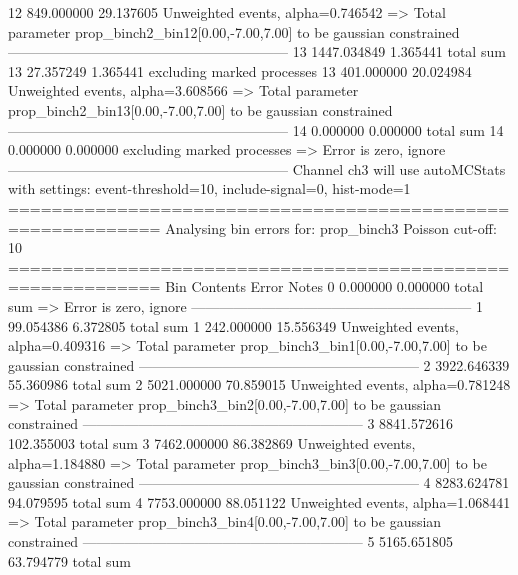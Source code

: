 12         849.000000      29.137605       Unweighted events, alpha=0.746542
  => Total parameter prop_binch2_bin12[0.00,-7.00,7.00] to be gaussian constrained
------------------------------------------------------------
13         1447.034849     1.365441        total sum                     
13         27.357249       1.365441        excluding marked processes    
13         401.000000      20.024984       Unweighted events, alpha=3.608566
  => Total parameter prop_binch2_bin13[0.00,-7.00,7.00] to be gaussian constrained
------------------------------------------------------------
14         0.000000        0.000000        total sum                     
14         0.000000        0.000000        excluding marked processes    
  => Error is zero, ignore      
------------------------------------------------------------
Channel ch3 will use autoMCStats with settings: event-threshold=10, include-signal=0, hist-mode=1
============================================================
Analysing bin errors for: prop_binch3
Poisson cut-off: 10
============================================================
Bin        Contents        Error           Notes                         
0          0.000000        0.000000        total sum                     
  => Error is zero, ignore      
------------------------------------------------------------
1          99.054386       6.372805        total sum                     
1          242.000000      15.556349       Unweighted events, alpha=0.409316
  => Total parameter prop_binch3_bin1[0.00,-7.00,7.00] to be gaussian constrained
------------------------------------------------------------
2          3922.646339     55.360986       total sum                     
2          5021.000000     70.859015       Unweighted events, alpha=0.781248
  => Total parameter prop_binch3_bin2[0.00,-7.00,7.00] to be gaussian constrained
------------------------------------------------------------
3          8841.572616     102.355003      total sum                     
3          7462.000000     86.382869       Unweighted events, alpha=1.184880
  => Total parameter prop_binch3_bin3[0.00,-7.00,7.00] to be gaussian constrained
------------------------------------------------------------
4          8283.624781     94.079595       total sum                     
4          7753.000000     88.051122       Unweighted events, alpha=1.068441
  => Total parameter prop_binch3_bin4[0.00,-7.00,7.00] to be gaussian constrained
------------------------------------------------------------
5          5165.651805     63.794779       total sum                     
